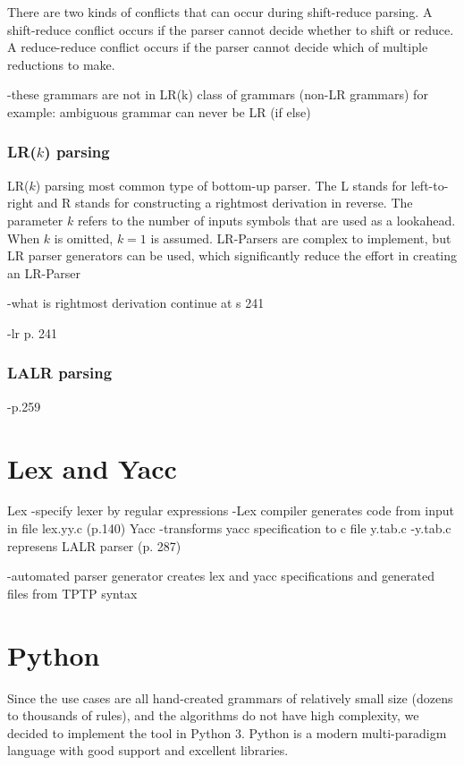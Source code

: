 There are two kinds of conflicts that can occur during shift-reduce parsing. A shift-reduce conflict occurs if the parser cannot decide whether to shift or reduce.
A reduce-reduce conflict occurs if the parser cannot decide which of multiple reductions to make.

-these grammars are not in LR(k) class of grammars (non-LR grammars)
for example: ambiguous grammar can never be LR (if else)
\cite{Aho.2007}

\subsubsection{LR($k$) parsing}\label{sec:BackgroundParserLR}

LR($k$) parsing most common type of bottom-up parser. The L stands for left-to-right and R stands for constructing a rightmost derivation in reverse. The parameter $k$ refers to the number of inputs symbols that are used as a lookahead. When $k$ is omitted, $k = 1$ is assumed.
LR-Parsers are complex to implement, but LR parser generators can be used, which significantly reduce the effort in creating an LR-Parser

-what is rightmost derivation
continue at s 241


\cite{Aho.2007}
-lr p. 241

\subsubsection{LALR parsing}\label{sec:BackgroundParserLALR}

\cite{Aho.2007}
-p.259

\section{Lex and Yacc}\label{sec:BackgroundLexYacc}

Lex
-specify lexer by regular expressions
-Lex compiler generates code from input in file lex.yy.c
(p.140)
Yacc
-transforms yacc specification to c file y.tab.c
-y.tab.c represens LALR parser
(p. 287)
\cite{Aho.2007}

-automated parser generator creates lex and yacc specifications and generated files from \ac{TPTP} syntax

\section{Python}\label{sec:BackgroundPython}

Since the use cases are all hand-created grammars of relatively small
size (dozens to thousands of rules), and the algorithms do not have
high complexity, we decided to implement the tool in Python 3. Python
is a modern multi-paradigm language with good support and excellent
libraries.


